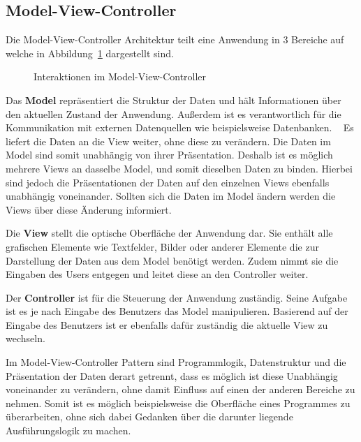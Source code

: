     \newpage
    \subsection{Model-View-Controller}\label{subsec:model-view-controller}
    Die Model-View-Controller Architektur teilt eine Anwendung in 3 Bereiche auf welche in Abbildung~\ref{fig:mvc} dargestellt sind.

    \begin{figure}[h]
        \centering
        
        \caption{Interaktionen im Model-View-Controller}
        \label{fig:mvc}
    \end{figure}

    Das \textbf{Model} repräsentiert die Struktur der Daten und hält Informationen über den aktuellen Zustand der Anwendung.
    Außerdem ist es verantwortlich für die Kommunikation mit externen Datenquellen wie beispielsweise Datenbanken.
    ~\cite{mvc}
    Es liefert die Daten an die View weiter, ohne diese zu verändern.
    Die Daten im Model sind somit unabhängig von ihrer Präsentation.
    Deshalb ist es möglich mehrere Views an dasselbe Model, und somit dieselben Daten zu binden.
    Hierbei sind jedoch die Präsentationen der Daten auf den einzelnen Views ebenfalls unabhängig voneinander.
    Sollten sich die Daten im Model ändern werden die Views über diese Änderung informiert.~\cite{https://doi.org/10.48550/arxiv.1408.5786}

    Die \textbf{View} stellt die optische Oberfläche der Anwendung dar.
    Sie enthält alle grafischen Elemente wie Textfelder, Bilder oder anderer Elemente die zur Darstellung der Daten aus dem Model benötigt werden.
    Zudem nimmt sie die Eingaben des Users entgegen und leitet diese an den Controller weiter.~\cite{https://doi.org/10.48550/arxiv.1408.5786}


    Der \textbf{Controller} ist für die Steuerung der Anwendung zuständig.
    Seine Aufgabe ist es je nach Eingabe des Benutzers das Model manipulieren.
    Basierend auf der Eingabe des Benutzers ist er ebenfalls dafür zuständig die aktuelle View zu wechseln.~\cite{https://doi.org/10.48550/arxiv.1408.5786}


    Im Model-View-Controller Pattern sind Programmlogik, Datenstruktur und die Präsentation der Daten derart getrennt, dass es möglich ist diese Unabhängig voneinander zu verändern, ohne damit Einfluss auf einen der anderen Bereiche zu nehmen.
    Somit ist es möglich beispielsweise die Oberfläche eines Programmes zu überarbeiten, ohne sich dabei Gedanken über die darunter liegende Ausführungslogik zu machen. ~\cite{mvc}

